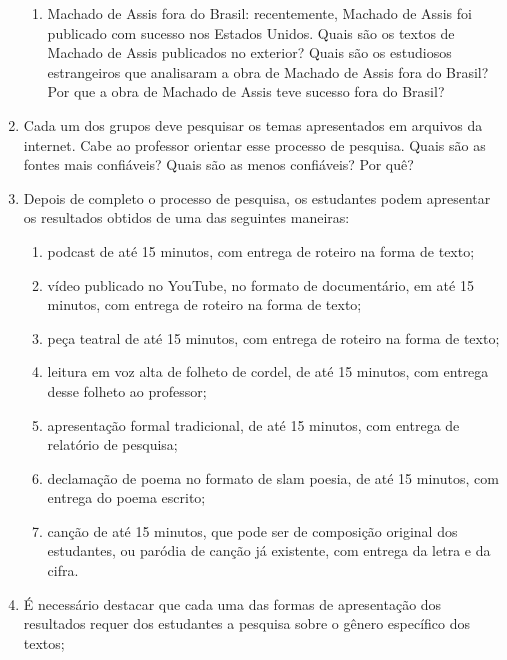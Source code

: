 \documentclass{extarticle}
\begin{document}
\begin{enumerate}
\begin{enumerate}
\item Machado de Assis fora do Brasil: recentemente, Machado de Assis foi
publicado com sucesso nos Estados Unidos. Quais são os textos de Machado
de Assis publicados no exterior? Quais são os estudiosos estrangeiros
que analisaram a obra de Machado de Assis fora do Brasil? Por que a obra
de Machado de Assis teve sucesso fora do Brasil?
\end{enumerate}

\item Cada um dos grupos deve pesquisar os temas apresentados em arquivos
da internet. Cabe ao professor orientar esse processo de pesquisa. Quais
são as fontes mais confiáveis? Quais são as menos confiáveis? Por quê?

\item Depois de completo o processo de pesquisa, os estudantes podem
apresentar os resultados obtidos de uma das seguintes maneiras:

\begin{enumerate}
\item podcast de até 15 minutos, com entrega de roteiro na forma de texto;

\item vídeo publicado no YouTube, no formato de documentário, em até 15
minutos, com entrega de roteiro na forma de texto;

\item peça teatral de até 15 minutos, com entrega de roteiro na forma de
texto;

\item leitura em voz alta de folheto de cordel, de até 15 minutos, com
entrega desse folheto ao professor;

\item apresentação formal tradicional, de até 15 minutos, com entrega de
relatório de pesquisa;

\item declamação de poema no formato de slam poesia, de até 15 minutos, com
entrega do poema escrito;

\item canção de até 15 minutos, que pode ser de composição original dos
estudantes, ou paródia de canção já existente, com entrega da letra e da
cifra.
\end{enumerate}

\item É necessário destacar que cada uma das formas de apresentação dos
resultados requer dos estudantes a pesquisa sobre o gênero específico
dos textos;


\end{enumerate}
\end{document}
